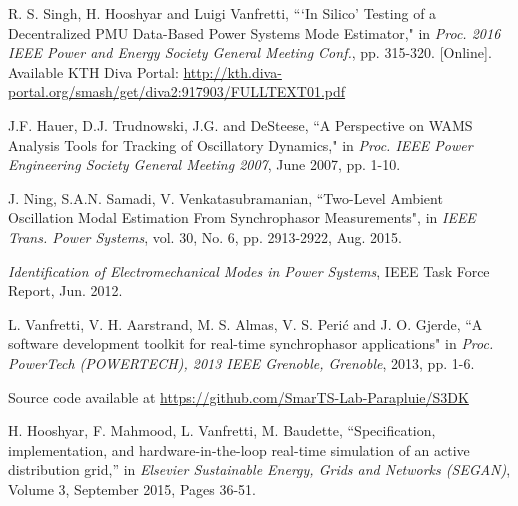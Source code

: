 \documentclass[conference]{IEEEtran}
\begin{document}
%
%
%
\begin{thebibliography}{16}

R. S. Singh, H. Hooshyar and Luigi Vanfretti, ```In Silico' Testing of a Decentralized PMU
Data-Based Power Systems Mode Estimator," in \emph{Proc. 2016 IEEE Power and Energy Society General Meeting Conf.}, pp. 315-320. [Online]. Available KTH Diva Portal: \url{http://kth.diva-portal.org/smash/get/diva2:917903/FULLTEXT01.pdf}

J.F. Hauer, D.J.  Trudnowski, J.G. and DeSteese, ``A Perspective on WAMS Analysis Tools for Tracking of Oscillatory Dynamics," in \emph{Proc. IEEE Power Engineering Society General Meeting 2007}, June 2007, pp. 1-10.

J. Ning, S.A.N. Samadi, V. Venkatasubramanian, ``Two-Level Ambient Oscillation Modal Estimation From Synchrophasor Measurements", in \emph{IEEE Trans. Power Systems}, vol. 30, No. 6, pp. 2913-2922, Aug. 2015.

\emph{Identification of Electromechanical Modes in Power Systems}, IEEE Task Force Report, Jun. 2012.

L. Vanfretti, V. H. Aarstrand, M. S. Almas, V. S. Perić and J. O. Gjerde, ``A software development toolkit for real-time synchrophasor applications" in \emph{Proc. PowerTech (POWERTECH), 2013 IEEE Grenoble, Grenoble}, 2013, pp. 1-6.

Source code available at \url{https://github.com/SmarTS-Lab-Parapluie/S3DK}

H. Hooshyar, F. Mahmood, L. Vanfretti, M. Baudette, ``Specification,
implementation, and hardware-in-the-loop real-time simulation of an active distribution grid,” in \emph{Elsevier Sustainable Energy, Grids and Networks (SEGAN)}, Volume 3, September 2015, Pages 36-51.
\end{thebibliography}




\end{document}
